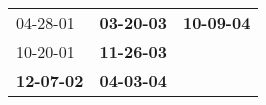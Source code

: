 \begin{supertabular}{p{0.33\columnwidth}p{0.33\columnwidth}p{0.33\columnwidth}}
          04-28-01\textsuperscript{} &  \textbf{03-20-03\textsuperscript{}} &  \textbf{10-09-04\textsuperscript{}} \\
          10-20-01\textsuperscript{} &  \textbf{11-26-03\textsuperscript{}} &                                      \\
 \textbf{12-07-02\textsuperscript{}} &  \textbf{04-03-04\textsuperscript{}} &                                      \\
\end{supertabular}
